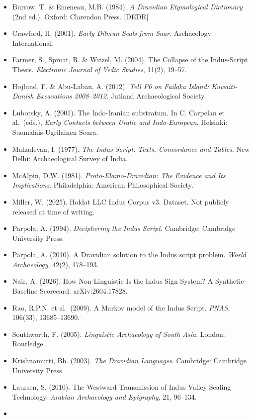 \documentclass[
]{article}
\providecommand{\tightlist}{%
  \setlength{\itemsep}{0pt}\setlength{\parskip}{0pt}}
\begin{document}
\begin{itemize}
\tightlist
\item
  Burrow, T. \& Emeneau, M.B. (1984). \emph{A Dravidian Etymological
  Dictionary} (2nd ed.). Oxford: Clarendon Press. {[}DEDR{]}
\item
  Crawford, H. (2001). \emph{Early Dilmun Seals from Saar}. Archaeology
  International.
\item
  Farmer, S., Sproat, R. \& Witzel, M. (2004). The Collapse of the
  Indus-Script Thesis. \emph{Electronic Journal of Vedic Studies},
  11(2), 19--57.
\item
  Hojlund, F. \& Abu-Laban, A. (2012). \emph{Tell F6 on Failaka Island:
  Kuwaiti-Danish Excavations 2008--2012}. Jutland Archaeological
  Society.
\item
  Lubotsky, A. (2001). The Indo-Iranian substratum. In C. Carpelan et
  al.~(eds.), \emph{Early Contacts between Uralic and Indo-European}.
  Helsinki: Suomalais-Ugrilainen Seura.
\item
  Mahadevan, I. (1977). \emph{The Indus Script: Texts, Concordance and
  Tables}. New Delhi: Archaeological Survey of India.
\item
  McAlpin, D.W. (1981). \emph{Proto-Elamo-Dravidian: The Evidence and
  Its Implications}. Philadelphia: American Philosophical Society.
\item
  Miller, W. (2025). Holdat LLC Indus Corpus v3. Dataset. Not publicly released at time of writing.
\item
  Parpola, A. (1994). \emph{Deciphering the Indus Script}. Cambridge:
  Cambridge University Press.
\item
  Parpola, A. (2010). A Dravidian solution to the Indus script problem.
  \emph{World Archaeology}, 42(2), 178--193.
\item
  Nair, A. (2026). How Non-Linguistic Is the Indus Sign System? A
  Synthetic-Baseline Scorecard. arXiv:2604.17828.
\item
  Rao, R.P.N. et al.~(2009). A Markov model of the Indus Script.
  \emph{PNAS}, 106(33), 13685--13690.
\item
  Southworth, F. (2005). \emph{Linguistic Archaeology of South Asia}.
  London: Routledge.
\item
  Krishnamurti, Bh. (2003). \emph{The Dravidian Languages}. Cambridge:
  Cambridge University Press.
\item
  Laursen, S. (2010). The Westward Transmission of Indus Valley Sealing
  Technology. \emph{Arabian Archaeology and Epigraphy}, 21, 96--134.
\item

\end{itemize}
\end{document}
